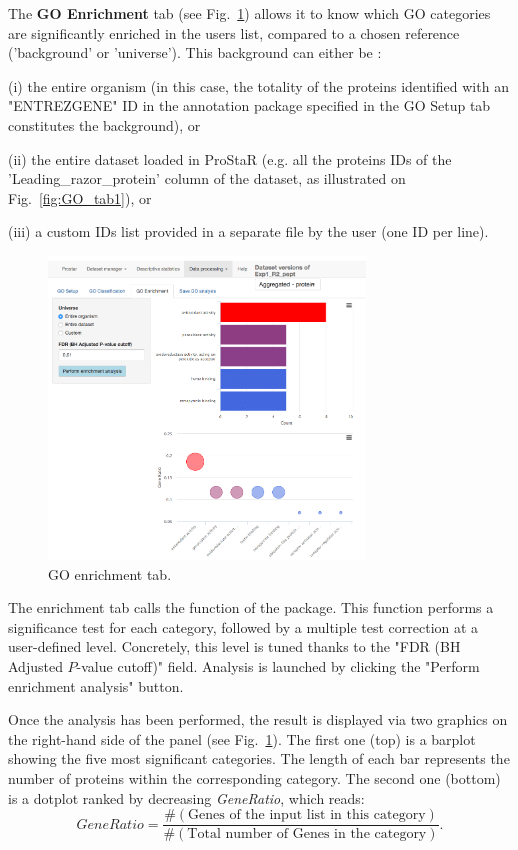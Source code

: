 \documentclass[12pt]{article}
\begin{document}
{The \textbf{GO Enrichment} tab (see Fig.~\ref{fig:GO_tab3}) allows it to know which
GO categories are significantly enriched in the users list, compared 
to a chosen reference ('background' or 'universe'). 
This background can either be : 

(i) the entire 
organism (in this case, the totality of the proteins identified with an 
"ENTREZGENE" ID in the annotation package specified in the GO Setup tab 
constitutes the background), or 

(ii) the entire dataset loaded in ProStaR (e.g. all the proteins IDs of the 
'Leading\_razor\_protein' column of the dataset, as illustrated on 
Fig.~\ref{fig:GO_tab1}), or 

(iii) a custom IDs list provided in a separate file by the user (one ID per line). 


\begin {figure}
\centering
\includegraphics[width=0.75\textwidth]{images/GO_tab3.png}
\caption{GO enrichment tab.}\label{fig:GO_tab3}
\end {figure}

The enrichment tab calls the  function of the 
 package. This function performs a significance test
for each category, followed by a multiple test correction at a user-defined level.
Concretely, this level is tuned thanks to 
the "FDR (BH Adjusted $P$-value cutoff)" field. 
Analysis is launched by clicking the "Perform enrichment analysis" button.

Once the analysis has been performed, the result is displayed via two graphics 
on the right-hand side of the panel (see Fig.~\ref{fig:GO_tab3}). 
The first one (top) is a barplot showing the five most significant categories. The 
length of each bar represents the number of proteins within the corresponding category. 
The second one (bottom) is a dotplot ranked by decreasing \textit{GeneRatio}, which reads: 
$$
{\textit{GeneRatio}}
=
\frac{\#(\mbox{Genes of the input list in this category})}
{\#(\mbox{Total number of Genes in the category})}.
$$


}
\end{document}
